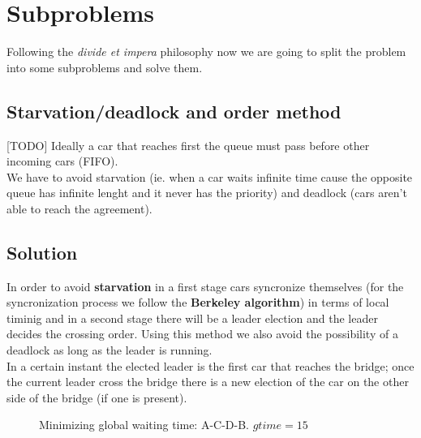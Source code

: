 \section{Subproblems}

Following the \textit{divide et impera} philosophy now we are going to split the problem 
into some subproblems and solve them. 


\subsection{Starvation/deadlock and order method}

[TODO] Ideally a car that reaches first the queue must pass before other 
incoming cars (FIFO).\\

We have to avoid starvation (ie. when a car waits infinite time cause the opposite queue 
has infinite lenght and it never has the priority) and deadlock (cars aren't able to 
reach the agreement). 


\subsection{Solution}

In order to avoid \textbf{starvation} in a first stage cars syncronize themselves 
(for the syncronization process we follow the \textbf{Berkeley algorithm})
in terms of local timinig and in a second stage there will be a leader election 
and the leader decides the crossing order. Using this method we also avoid 
the possibility of a deadlock as long as the leader is running.\\

In a certain instant the elected leader is the first car that reaches the bridge; 
once the current leader cross the bridge there is a new election of the car on the other side 
of the bridge (if one is present).\\

\begin{figure}[h]
    \centering
    \caption{Minimizing global waiting time: A-C-D-B. $gtime = 15$} \label{fig:1}
\end{figure}

